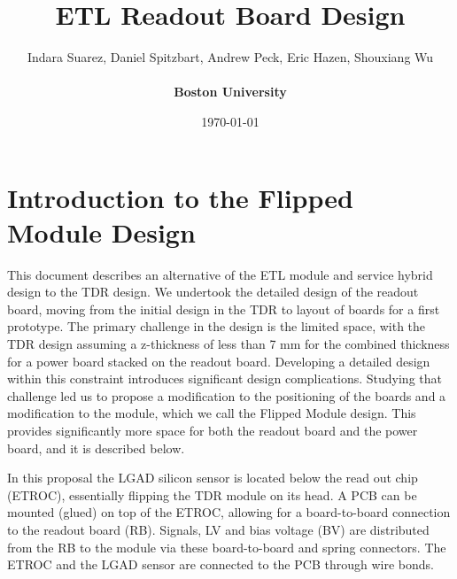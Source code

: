 \documentclass[11pt]{article}
\title{ETL Readout Board Design}
\author{Indara Suarez, Daniel Spitzbart, Andrew Peck, Eric Hazen, Shouxiang Wu
  \\
  \\ \Large{\textbf{Boston University}}}
\date{\today}
\begin{document}
\maketitle

\tableofcontents

\section{Introduction to the Flipped Module Design}

This document describes an alternative of the ETL module and service hybrid design to the TDR design.
We undertook the detailed design of the readout board, moving from the initial design in the TDR to layout of boards for a first prototype.
The primary challenge in the design is the limited space, with the TDR design assuming a z-thickness of less than 7 mm for the combined thickness for a power board stacked on the readout board.
Developing a detailed design within this constraint introduces significant design complications.
Studying that challenge led us to propose a modification to the positioning of the boards and a modification to the module, which we call the Flipped Module design.
This provides significantly more space for both the readout board and the power board, and it is described below.

In this proposal the LGAD silicon sensor is located below the read out chip (ETROC), essentially flipping the TDR module on its head.
A PCB can be mounted (glued) on top of the ETROC, allowing for a board-to-board connection to the readout board (RB).
Signals, LV and bias voltage (BV) are distributed from the RB to the module via these board-to-board and spring connectors.
The ETROC and the LGAD sensor are connected to the PCB through wire bonds.
\end{document}
